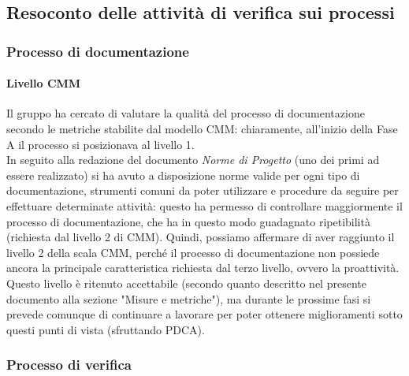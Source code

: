 \documentclass[../PianoDiQualifica.tex]{subfiles}
\begin{document}
\begin{appendices}
	\subsection{Resoconto delle attività di verifica sui processi}
		\subsubsection{Processo di documentazione}
			\paragraph{Livello CMM}
			Il gruppo ha cercato di valutare la qualità del processo di documentazione secondo le metriche stabilite dal modello CMM: chiaramente, all'inizio della Fase A il processo si posizionava al livello 1.\\
			In seguito alla redazione del documento \textit{Norme di Progetto} (uno dei primi ad essere realizzato) si ha avuto a disposizione norme valide per ogni tipo di documentazione, strumenti comuni da poter utilizzare e procedure da seguire per effettuare determinate attività: questo ha permesso di controllare maggiormente il processo di documentazione, che ha in questo modo guadagnato ripetibilità (richiesta dal livello 2 di CMM).
			Quindi, possiamo affermare di aver raggiunto il livello 2 della scala CMM, perché il processo di documentazione non possiede ancora la principale caratteristica richiesta dal terzo livello, ovvero la proattività.
			Questo livello è ritenuto accettabile (secondo quanto descritto nel presente documento alla sezione "Misure e metriche"), ma durante le prossime fasi si prevede comunque di continuare a lavorare per poter ottenere miglioramenti sotto questi punti di vista (sfruttando PDCA).
		\subsubsection{Processo di verifica}

\end{appendices}
\end{document}
